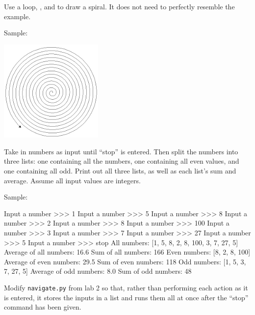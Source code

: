 \documentclass[11pt]{cselabheader}
\begin{document}
\begin{ex}[spiral.py] Use a  loop, , and
   to draw a spiral. It does not need to perfectly resemble
  the example.

  Sample:
  \begin{center}
    \includegraphics[width=2.0in]{img/spiral}
  \end{center}
\end{ex}

\begin{ex}[parity.py] Take in numbers as input until ``stop'' is entered. Then
  split the numbers into three lists: one containing all the numbers, one
  containing all even values, and one containing all odd. Print out all three
  lists, as well as each list's sum and average. Assume all input values are
  integers.

  Sample:

\begin{verbatimcode}
Input a number >>> 1
Input a number >>> 5
Input a number >>> 8
Input a number >>> 2
Input a number >>> 8
Input a number >>> 100
Input a number >>> 3
Input a number >>> 7
Input a number >>> 27
Input a number >>> 5
Input a number >>> stop
All numbers: [1, 5, 8, 2, 8, 100, 3, 7, 27, 5]
Average of all numbers: 16.6
Sum of all numbers: 166
Even numbers: [8, 2, 8, 100]
Average of even numbers: 29.5
Sum of even numbers: 118
Odd numbers: [1, 5, 3, 7, 27, 5]
Average of odd numbers: 8.0
Sum of odd numbers: 48
\end{verbatimcode}
\end{ex}


\begin{ex}[navigate2.py] Modify \texttt{navigate.py} from lab 2 so that,
  rather than performing each action as it is entered, it stores the inputs in a
  list and runs them all at once after the ``stop'' command has been given.
\end{ex}
\end{document}
